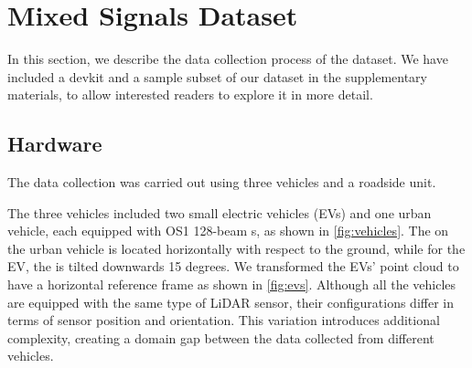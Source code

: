 \section{Mixed Signals Dataset}
In this section, we describe the data collection process of the \ours dataset. We have included a devkit and a sample subset of our dataset in the supplementary materials, to allow interested readers to explore it in more detail.

\vspace{-2px}
\subsection{Hardware}

The data collection was carried out using three vehicles and a roadside unit. 

The three vehicles included two small electric vehicles (EVs) and one urban vehicle, each equipped with OS1 128-beam {\lidar}s, as shown in \autoref{fig:vehicles}. 
The \lidar on the urban vehicle is located horizontally with respect to the ground, while for the EV, the \lidar is tilted downwards 15 degrees. We transformed the EVs' point cloud to have a horizontal reference frame as shown in \autoref{fig:evs}. Although all the vehicles are equipped with the same type of LiDAR sensor, their configurations differ in terms of sensor position and orientation. This variation introduces additional complexity, creating a domain gap between the data collected from different vehicles.

